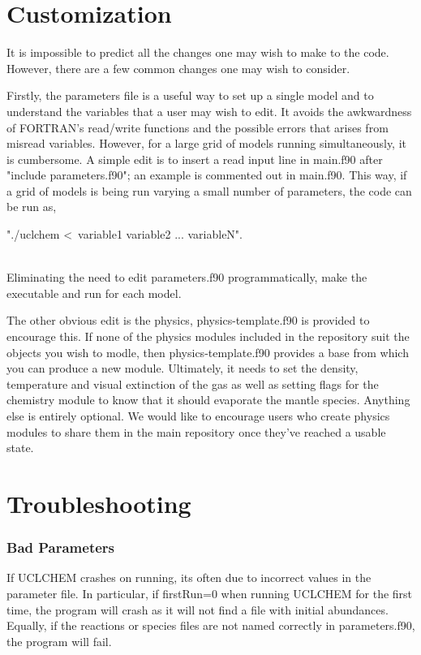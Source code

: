 \documentclass{llncs}
\begin{document}
\section{Customization}
\label{sec:alter}
It is impossible to predict all the changes one may wish to make to the code. However, there are a few common changes one may wish to consider.\par
Firstly, the parameters file is a useful way to set up a single model and to understand the variables that a user may wish to edit. It avoids the awkwardness of FORTRAN's read/write functions and the possible errors that arises from misread variables. However, for a large grid of models running simultaneously, it is cumbersome. A simple edit is to insert a read input line in main.f90 after "include parameters.f90"; an example is commented out in main.f90. This way, if a grid of models is being run varying a small number of parameters, the code can be run as,\\
 \centerline{"./uclchem \textless ~variable1 variable2 ... variableN".}\\
Eliminating the need to edit parameters.f90 programmatically, make the executable and run for each model.\par
The other obvious edit is the physics, physics-template.f90 is provided to encourage this. If none of the physics modules included in the repository suit the objects you wish to modle, then physics-template.f90 provides a base from which you can produce a new module. Ultimately, it needs to set the density, temperature and visual extinction of the gas as well as setting flags for the chemistry module to know that it should evaporate the mantle species. Anything else is entirely optional. We would like to encourage users who create physics modules to share them in the main repository once they've reached a usable state.

\section{Troubleshooting}
\label{sec:trouble}
\subsubsection{Bad Parameters}
If UCLCHEM crashes on running, its often due to incorrect values in the parameter file. In particular, if firstRun=0 when running UCLCHEM for the first time, the program will crash as it will not find a file with initial abundances. Equally, if the reactions or species files are not named correctly in parameters.f90, the program will fail.
\end{document}
